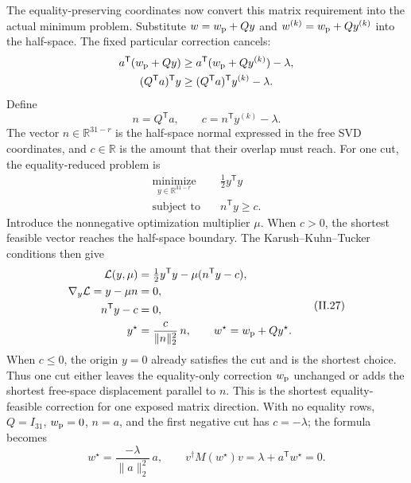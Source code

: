 \documentclass[10pt,letterpaper,twocolumn]{article}
\newcommand{\R}{\mathbb R}
\begin{document}
The equality-preserving coordinates now convert this matrix requirement into
the actual minimum problem.  Substitute
\(w=w_{\rm p}+Qy\) and \(w^{(k)}=w_{\rm p}+Qy^{(k)}\) into the half-space.
The fixed particular correction cancels:
\[
\begin{aligned}
a^{\mathsf T}(w_{\rm p}+Qy)
&\geq a^{\mathsf T}(w_{\rm p}+Qy^{(k)})-\lambda,\\
(Q^{\mathsf T}a)^{\mathsf T}y
&\geq (Q^{\mathsf T}a)^{\mathsf T}y^{(k)}-\lambda.
\end{aligned}
\]
Define
\[
n=Q^{\mathsf T}a,
\qquad
c=n^{\mathsf T}y^{(k)}-\lambda.
\tag{II.26}
\]
The vector \(n\in\R^{31-r}\) is the half-space normal expressed in the free
SVD coordinates, and \(c\in\R\) is the amount that their overlap must reach.
For one cut, the equality-reduced problem is
\[
\begin{aligned}
\underset{y\in\R^{31-r}}{\operatorname{minimize}}\quad
&\tfrac12y^{\mathsf T}y\\
\text{subject to}\quad&n^{\mathsf T}y\geq c.
\end{aligned}
\tag{II.26a}
\]
Introduce the nonnegative optimization multiplier \(\mu\).  When \(c>0\),
the shortest feasible vector reaches the half-space boundary.  The
Karush--Kuhn--Tucker conditions then give
\[
\begin{aligned}
\mathcal L(y,\mu)
&=\tfrac12y^{\mathsf T}y-\mu(n^{\mathsf T}y-c),\\
\nabla_y\mathcal L=y-\mu n&=0,\\
n^{\mathsf T}y-c&=0,\\
y^\star&=\frac{c}{\lVert n\rVert_2^2}\,n,
\qquad
w^\star=w_{\rm p}+Qy^\star.
\end{aligned}
\tag{II.27}
\]
When \(c\leq0\), the origin \(y=0\) already satisfies the cut and is the
shortest choice.  Thus one cut either leaves the equality-only correction
\(w_{\rm p}\) unchanged or adds the shortest free-space displacement parallel
to \(n\).
This is the shortest equality-feasible correction for one exposed matrix
direction.  With no equality rows, \(Q=I_{31}\), \(w_{\rm p}=0\),
\(n=a\), and the first negative cut has \(c=-\lambda\); the formula becomes
\[
w^\star=\frac{-\lambda}{\lVert a\rVert_2^2}\,a,
\qquad
v^\dagger M(w^\star)v
=\lambda+a^{\mathsf T}w^\star=0.
\tag{II.27a}
\]
\end{document}
